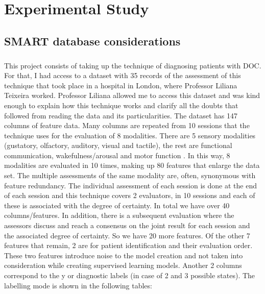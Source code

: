 \chapter{Experimental Study}\label{chap:chap4}



\section*{}
\section{SMART database considerations }
\paragraph{}This project consists of taking up the technique of diagnosing patients with DOC. For that, I had access to a dataset with 35 records of the assessment of this technique that took place in a hospital in London, where Professor Liliana Teixeira worked. Professor Liliana allowed me to access this dataset and was kind enough to explain how this technique works and clarify all the doubts that followed from reading the data and its particularities. The dataset has 147 columns of feature data. Many columns are repeated from 10 sessions that the technique uses for the evaluation of 8 modalities. There are 5 sensory modalities (gustatory, olfactory, auditory, visual and tactile), the rest are functional communication, wakefulness/arousal and motor function \cite{Gill-Thwaites2010}.
In this way, 8 modalities are evaluated in 10 times, making up 80 features that enlarge the data set. The multiple assessments of the same modality are, often, synonymous with feature redundancy.
The individual assessment of each session is done at the end of each session and this technique covers 2 evaluators, in 10 sessions and each of these is associated with the degree of certainty. In total we have over 40 columns/features.
In addition, there is a subsequent evaluation where the assessors discuss and reach a consensus on the joint result for each session and the associated degree of certainty. So we have 20 more features.
Of the other 7 features that remain, 2 are for patient identification and their evaluation order. These two features introduce noise to the model creation and not taken into consideration while creating supervised learning models.
Another 2 columns correspond to the y or diagnostic labels (in case of 2 and 3 possible states).
The labelling mode is shown in the following tables:
